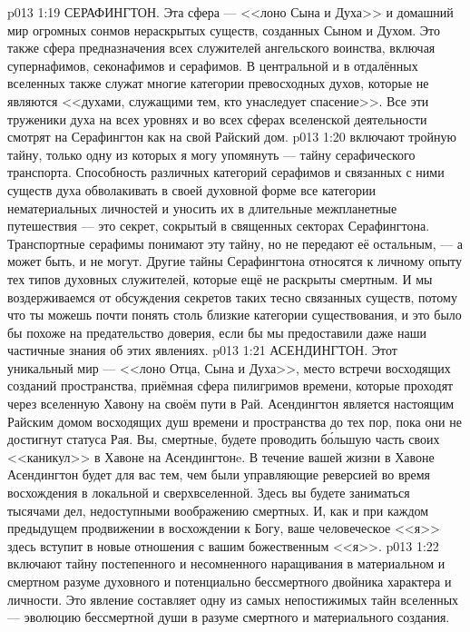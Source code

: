 \vs p013 1:19 СЕРАФИНГТОН. Эта сфера --- <<лоно Сына и Духа>> и домашний мир огромных сонмов нераскрытых существ, созданных Сыном и Духом. Это также сфера предназначения всех служителей ангельского воинства, включая супернафимов, секонафимов и серафимов. В центральной и в отдалённых вселенных также служат многие категории превосходных духов, которые не являются <<духами, служащими тем, кто унаследует спасение>>. Все эти труженики духа на всех уровнях и во всех сферах вселенской деятельности смотрят на Серафингтон как на свой Райский дом.
\vs p013 1:20 \pc {} включают тройную тайну, только одну из которых я могу упомянуть --- тайну серафического транспорта. Способность различных категорий серафимов и связанных с ними существ духа обволакивать в своей духовной форме все категории нематериальных личностей и уносить их в длительные межпланетные путешествия --- это секрет, сокрытый в священных секторах Серафингтона. Транспортные серафимы понимают эту тайну, но не передают её остальным, --- а может быть, и не могут. Другие тайны Серафингтона относятся к личному опыту тех типов духовных служителей, которые ещё не раскрыты смертным. И мы воздерживаемся от обсуждения секретов таких тесно связанных существ, потому что ты можешь почти понять столь близкие категории существования, и это было бы похоже на предательство доверия, если бы мы предоставили даже наши частичные знания об этих явлениях.
\vs p013 1:21 АСЕНДИНГТОН. Этот уникальный мир --- <<лоно Отца, Сына и Духа>>, место встречи восходящих созданий пространства, приёмная сфера пилигримов времени, которые проходят через вселенную Хавону на своём пути в Рай. Асендингтон является настоящим Райским домом восходящих душ времени и пространства до тех пор, пока они не достигнут статуса Рая. Вы, смертные, будете проводить б\'ольшую часть своих <<каникул>> в Хавоне на Асендингтонe. В течение вашей жизни в Хавоне Асендингтон будет для вас тем, чем были управляющие реверсией во время восхождения в локальной и сверхвселенной. Здесь вы будете заниматься тысячами дел, недоступными воображению смертных. И, как и при каждом предыдущем продвижении в восхождении к Богу, ваше человеческое <<я>> здесь вступит в новые отношения с вашим божественным <<я>>.
\vs p013 1:22 \pc {} включают тайну постепенного и несомненного наращивания в материальном и смертном разуме духовного и потенциально бессмертного двойника характера и личности. Это явление составляет одну из самых непостижимых тайн вселенных --- эволюцию бессмертной души в разуме смертного и материального создания.
